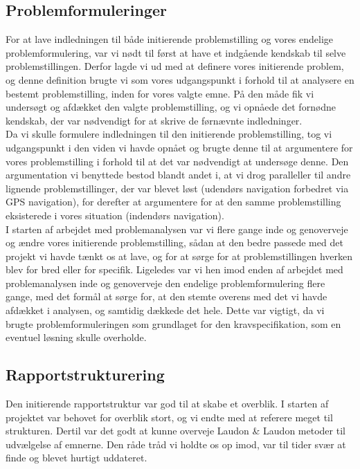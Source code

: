 \documentclass[a4paper,12pt,oneside,article]{memoir}
\begin{document}
        \subsection{Problemformuleringer}

        For at lave indledningen til både initierende problemstilling og vores endelige problemformulering, var vi nødt til først at have et indgående kendskab til selve problemstillingen. Derfor lagde vi ud med at definere vores initierende problem, og denne definition brugte vi som vores udgangspunkt i forhold til at analysere en bestemt problemstilling, inden for vores valgte emne. På den måde fik vi undersøgt og afdækket den valgte problemstilling, og vi opnåede det fornødne kendskab, der var nødvendigt for at skrive de førnævnte indledninger.\\
        Da vi skulle formulere indledningen til den initierende problemstilling, tog vi udgangspunkt i den viden vi havde opnået og brugte denne til at argumentere for vores problemstilling i forhold til at det var nødvendigt at undersøge denne. Den argumentation vi benyttede bestod blandt andet i, at vi drog paralleller til andre lignende problemstillinger, der var blevet løst (udendørs navigation forbedret via GPS navigation), for derefter at argumentere for at den samme problemstilling eksisterede i vores situation (indendørs navigation).\\
        I starten af arbejdet med problemanalysen var vi flere gange inde og genoverveje og ændre vores initierende problemstilling, sådan at den bedre passede med det projekt vi havde tænkt os at lave, og for at sørge for at problemstillingen hverken blev for bred eller for specifik.
        Ligeledes var vi hen imod enden af arbejdet med problemanalysen inde og genoverveje den endelige problemformulering flere gange, med det formål at sørge for, at den stemte overens med det vi havde afdækket i analysen, og samtidig dækkede det hele. Dette var vigtigt, da vi brugte problemformuleringen som grundlaget for den kravspecifikation, som en eventuel løsning skulle overholde.

        

        

        

\subsection{Rapportstrukturering}

Den initierende rapportstruktur var god til at skabe et overblik. I starten af projektet var behovet for overblik stort, og vi endte med at referere meget til strukturen. Dertil var det godt at kunne overveje Laudon \& Laudon metoder til udvælgelse af emnerne. Den råde tråd vi holdte os op imod, var til tider svær at finde og blevet hurtigt uddateret.
\end{document}
